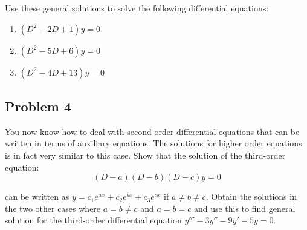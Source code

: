 \documentclass{article}
\begin{document}
 Use these general solutions to solve the following differential equations:
 \begin{enumerate}[label=(\alph*)]
\centering
\item $(D^2-2D+1)y=0$
\item $(D^2-5D+6)y=0$
\item $(D^2-4D+13)y=0$
\end{enumerate}

\subsection{Problem 4}
You now know how to deal with second-order differential equations that can be written in terms of auxiliary equations. The solutions for higher order equations is in fact very similar to this case. Show that the solution of the third-order equation:
 \begin{equation}
     (D-a)(D-b)(D-c)y=0
 \end{equation}
 
 can be written as $y=c_1e^{ax}+c_2e^{bx}+c_3e^{cx}$ if $a\neq b\neq c$. Obtain the solutions in the two other cases where $a=b\neq c$ and $a=b=c$ and use this to find general solution for the third-order differential equation $y'''-3y''-9y'-5y=0$.
  
\end{document}
